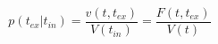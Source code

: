 \begin{equation}
p(t_{ex}|t_{in})  = \frac{v(t,t_{ex})}{V(t_{in})}= \frac{F(t,t_{ex})}{V(t)}
\end{equation}